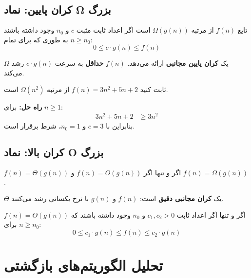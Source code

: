 \documentclass{matinbook}
\begin{document}
    \subsection{کران پایین: نماد Ω بزرگ}
    
    \begin{definition}
        تابع $f(n)$ از مرتبه $\Omega(g(n))$ است اگر
        اعداد ثابت مثبت $c$ و $n_{0}$ وجود داشته باشند
        به طوری که برای تمام $n \geq n_{0}$:
        \[
        0 \leq c \cdot g(n) \leq f(n)
        \]
        \label{def:big-omega}
    \end{definition}
    
    $\Omega$ یک \textbf{کران پایین مجانبی} ارائه می‌دهد.
    $f(n)$ \textbf{حداقل} به سرعت $c \cdot g(n)$ رشد می‌کند.
    
    \begin{example}
        ثابت کنید $f(n) = 3n^{2} + 5n + 2$ از مرتبه $\Omega(n^{2})$ است.
        
        \textbf{راه حل:}
        برای $n \geq 1$:
        \begin{align*}
            3n^{2} + 5n + 2 &\geq 3n^{2}
        \end{align*}
        بنابراین با $c = 3$ و $n_{0} = 1$،
        شرط برقرار است.
        \label{ex:omega-proof}
    \end{example}
    
    \subsection{کران بالا: نماد O بزرگ}
    
    \begin{definition}[$\Theta$]
        $f(n) = \Theta(g(n))$ اگر و تنها اگر
        $f(n) = O(g(n))$ و $f(n) = \Omega(g(n))$.
        \label{def:theta}
    \end{definition}
    
    $\Theta$ یک \textbf{کران مجانبی دقیق} است:
    $f(n)$ و $g(n)$ با نرخ یکسانی رشد می‌کنند.
    
    \begin{theorem}
        $f(n) = \Theta(g(n))$ اگر و تنها اگر
        اعداد ثابت $c_{1}, c_{2} > 0$ و $n_{0}$ وجود داشته باشند
        که برای $n \geq n_{0}$:
        \[
        0 \leq c_{1} \cdot g(n) \leq f(n) \leq c_{2} \cdot g(n)
        \]
        \label{thm:theta-condition}
    \end{theorem}
    
    \section{تحلیل الگوریتم‌های بازگشتی}
    
\end{document}
